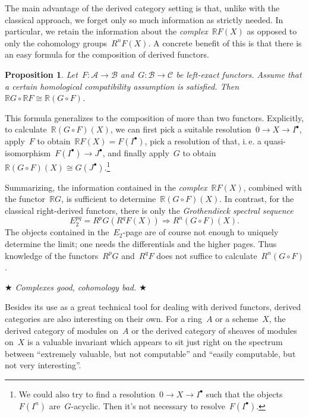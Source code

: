 \documentclass{amsart}
\makeatletter
\theoremstyle{definition}
\theoremstyle{plain}
\newtheorem{prop}[defn]{Proposition}
\theoremstyle{remark}
\newcommand{\A}{\mathcal{A}}
\newcommand{\B}{\mathcal{B}}
\newcommand{\C}{\mathcal{C}}
\newcommand{\RR}{\mathbb{R}}
\newcommand{\?}{\,{:}\,}
\renewcommand{\_}{\mathpunct{.}\,}
\newcommand{\ie}{i.\,e.\@\xspace}
\makeatother
\begin{document}
The main advantage of the derived category setting is that, unlike with the
classical approach, we forget only so much information as strictly needed.
In particular, we retain the information about the \emph{complex}~$\RR F(X)$ as
opposed to only the cohomology groups~$R^n F(X)$. A concrete benefit of this is
that there is an easy formula for the composition of derived functors.

\begin{prop}Let~$F : \A \to \B$ and~$G : \B \to \C$ be left-exact functors.
Assume that a certain homological compatibility assumption is satisfied.
Then~$\RR G \circ \RR F \cong \RR (G \circ F)$.\end{prop}

This formula generalizes to the composition of more than two functors.
Explicitly, to calculate~$\RR (G \circ F)(X)$, we can first pick a suitable
resolution~$0 \to X \to I^\bullet$, apply~$F$ to obtain~$\RR F(X) =
F(I^\bullet)$, pick a resolution of that, \ie a quasi-isomorphism~$F(I^\bullet)
\to J^\bullet$, and finally apply~$G$ to obtain~$\RR (G \circ F)(X) \cong
G(J^\bullet)$.\footnote{We could also try to find a resolution~$0 \to X \to
I^\bullet$ such that the objects~$F(I^n)$ are~$G$-acyclic. Then it's not
necessary to resolve~$F(I^\bullet)$.}

Summarizing, the information contained in the \emph{complex}~$\RR F(X)$, combined with the functor~$\RR G$, is
sufficient to determine~$\RR (G \circ F)(X)$. In contrast, for the classical
right-derived functors, there is only the \emph{Grothendieck spectral sequence}
\[ E_2^{pq} = R^p G(R^q F(X)) \Longrightarrow R^n (G \circ F)(X). \]
The objects contained in the~$E_2$-page are of course not enough to uniquely
determine the limit; one needs the differentials and the higher pages. Thus
knowledge of the functors~$R^p G$ and~$R^q F$ does not suffice to
calculate~$R^n(G \circ F)$.

\begin{center}\emph{$\bigstar$ Complexes good, cohomology bad. $\bigstar$}\end{center}

Besides its use as a great technical tool for dealing with derived functors,
derived categories are also interesting on their own. For a ring~$A$ or a
scheme~$X$, the derived category of modules on~$A$ or the derived category of
sheaves of modules on~$X$ is a valuable invariant which appears to sit just
right on the spectrum between ``extremely valuable, but not computable'' and
``easily computable, but not very interesting''.
\end{document}
